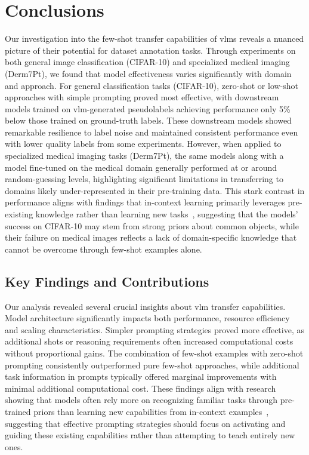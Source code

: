 \documentclass[../ShajiS_RnDReport.tex]{subfiles}
\begin{document}
    \section{Conclusions}
    \label{sec:conclusions}

    Our investigation into the few-shot transfer capabilities of \glspl{vlm} reveals a nuanced picture of their potential for dataset annotation tasks. Through experiments on both general image classification (CIFAR-10) and specialized medical imaging (Derm7Pt), we found that model effectiveness varies significantly with domain and approach. For general classification tasks (CIFAR-10), zero-shot or low-shot approaches with simple prompting proved most effective, with downstream models trained on \gls{vlm}-generated pseudolabels achieving performance only 5\% below those trained on ground-truth labels. These downstream models showed remarkable resilience to label noise and maintained consistent performance even with lower quality labels from some experiments. However, when applied to specialized medical imaging tasks (Derm7Pt), the same models along with a model fine-tuned on the medical domain generally performed at or around random-guessing levels, highlighting significant limitations in transferring to domains likely under-represented in their pre-training data. This stark contrast in performance aligns with findings that in-context learning primarily leverages pre-existing knowledge rather than learning new tasks~\cite{Chochlakis2024,Pan2023}, suggesting that the models' success on CIFAR-10 may stem from strong priors about common objects, while their failure on medical images reflects a lack of domain-specific knowledge that cannot be overcome through few-shot examples alone.

    \subsection{Key Findings and Contributions}
    \label{sec:conclusions:findings}

    Our analysis revealed several crucial insights about \gls{vlm} transfer capabilities. Model architecture significantly impacts both performance, resource efficiency and scaling characteristics. Simpler prompting strategies proved more effective, as additional shots or reasoning requirements often increased computational costs without proportional gains. The combination of few-shot examples with zero-shot prompting consistently outperformed pure few-shot approaches, while additional task information in prompts typically offered marginal improvements with minimal additional computational cost. These findings align with research showing that models often rely more on recognizing familiar tasks through pre-trained priors than learning new capabilities from in-context examples~\cite{Pan2023}, suggesting that effective prompting strategies should focus on activating and guiding these existing capabilities rather than attempting to teach entirely new ones.
\end{document}
